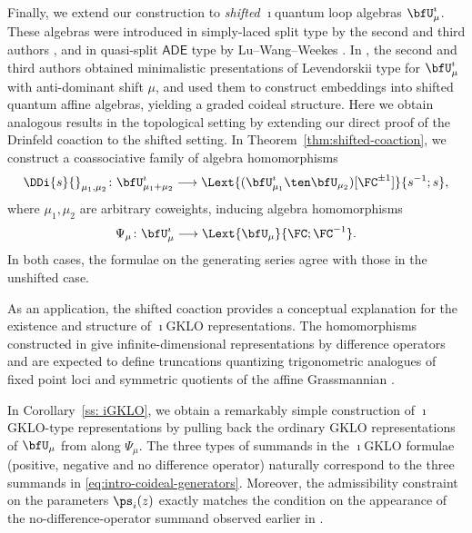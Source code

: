 \documentclass[reqno]{amsart}
\numberwithin{equation}{section}
\begin{document}
\subsection{}\label{ss:intro-shift}
Finally, we extend our construction to \emph{shifted} $\imath$quantum loop
algebras $\bfU^\imath_\mu$. These algebras were introduced in simply-laced
split type by the second and third authors \cite{LP-gklo}, and in quasi-split
$\mathsf{ADE}$ type by Lu--Wang--Weekes \cite{lu-wang-weekes-26}.
In \cite{LP-Lev}, the second and third authors obtained minimalistic
presentations of Levendorskii type for $\bfU^\imath_\mu$ with anti-dominant
shift $\mu$, and used them to construct embeddings into shifted quantum
affine algebras, yielding a graded coideal structure.
Here we obtain analogous results in the topological setting by extending
our direct proof of the Drinfeld coaction to the shifted setting.
In Theorem~\ref{thm:shifted-coaction}, we construct a coassociative family
of algebra homomorphisms
\[
\DDi{s}{}_{\mu_1,\mu_2}\colon
\bfU^\imath_{\mu_1+\mu_2}\longrightarrow
\Lext{(\bfU^\imath_{\mu_1}\ten\bfU_{\mu_2})[\FC^{\pm1}]}{s^{-1};s},
\]
where $\mu_1,\mu_2$ are arbitrary coweights, inducing algebra homomorphisms
\[
\Psi_\mu\colon
\bfU^\imath_\mu\longrightarrow
\Lext{\bfU_\mu}{\FC;\FC^{-1}}.
\]
In both cases, the formulae on the generating series agree with those in the
unshifted case.

As an application, the shifted coaction provides a conceptual explanation
for the existence and structure of $\imath$GKLO representations.
The homomorphisms constructed in \cite{LP-gklo,lu-wang-weekes-26} give
infinite-dimensional representations by difference operators and are
expected to define truncations quantizing trigonometric analogues of
fixed point loci and symmetric quotients of the affine Grassmannian
\cite{BPT,lu-wang-weekes-25}.

In Corollary~\ref{ss: iGKLO}, we obtain a remarkably simple construction of $\imath$GKLO-type representations
 by pulling back the ordinary GKLO representations of $\bfU_\mu$
from \cite{GKLOq,FT19} along $\Psi_\mu$. The three types of 
summands in the $\imath$GKLO formulae (positive, negative and no difference operator) naturally correspond to the three summands in 
\eqref{eq:intro-coideal-generators}. Moreover, the admissibility constraint on 
the parameters $\ps_i(z)$ exactly matches the condition on the appearance of 
the no-difference-operator summand observed earlier in \cite{lu-wang-weekes-25,lu-wang-weekes-26}.
\end{document}
